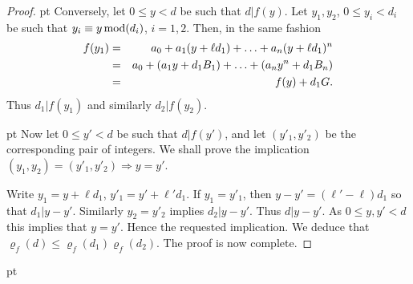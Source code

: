 \documentclass[11pt,draft,reqno]{amsart}
\makeatletter
\def\section{\@startsection{section}{1}%
     \z@{.7\linespacing\@plus\linespacing}{.5\linespacing}%
     {\bfseries%
     \centering
     }}
\theoremstyle{definition}
\theoremstyle{remarks}
\numberwithin{equation}{section}
\makeatother
\begin{document}
\begin{proof}
 pt Conversely, let $0\le y<d$ be such that $d|f(y)$. Let $y_1, y_2$, $0\le y_i<d_i$ be such that  $y_i\equiv y \, {\rm
mod}(d_i)$, $i=1,2$. Then, in the same fashion
\begin{eqnarray*}f(y_1)&=& a_0+a_1(y +\ell d_1)+\ldots + a_n(y +\ell d_1)^n \cr &=&a_0+(a_1 y +d_1 B_1  ) +\ldots + (a_n y ^n +  d_1B_n)\cr & =&
f(y )+ d_1 G.
\end{eqnarray*}
Thus $d_1|f(y_1)$ and  similarly $d_2|f(y_2)$. 

 pt Now let   $0\le y'<d$ be such that $d|f(y')$, and let $(y'_1, y'_2)$ be the corresponding
pair of integers. We shall prove the implication $  (y_1, y_2)=(y'_1, y'_2) \Rightarrow y=y'$. 

Write $y_1=y+\ell d_1$,
$y'_1=y'+\ell' d_1$. If $y_1=y'_1$, then $y-y'=(\ell'-\ell)d_1 $ so that $d_1|y-y'$. Similarly $y_2=y'_2$ implies $d_2|y-y'$. Thus
$d |y-y'$. As $0\le y,y'<d$ this implies that $y=y'$. Hence the requested implication.
We deduce  that
$ 
\varrho_f(d )\le \varrho_f(d_1)\varrho_f(d_2) $. The proof is now complete. 
\end{proof}

 pt
 
 
     
     
     
\end{document}
